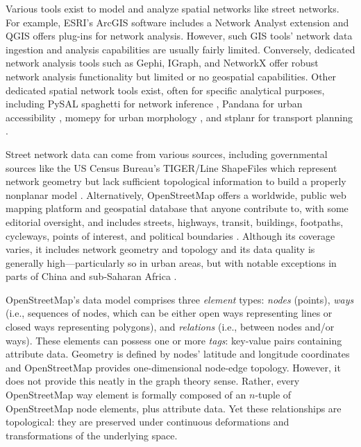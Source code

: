 \documentclass[12pt,letterpaper]{article} %
\begin{document}
Various tools exist to model and analyze spatial networks like street networks. For example, ESRI's ArcGIS software includes a Network Analyst extension and QGIS offers plug-ins for network analysis. However, such GIS tools' network data ingestion and analysis capabilities are usually fairly limited. Conversely, dedicated network analysis tools such as Gephi, IGraph, and NetworkX offer robust network analysis functionality but limited or no geospatial capabilities. Other dedicated spatial network tools exist, often for specific analytical purposes, including PySAL spaghetti for network inference \citep{gaboardi_spaghetti_2021,rey_pysal_2022}, Pandana for urban accessibility \citep{foti_behavioral_2014}, momepy for urban morphology \citep{fleischmann_momepy_2019}, and stplanr for transport planning \citep{lovelace_stplanr_2019}.

Street network data can come from various sources, including governmental sources like the US Census Bureau's TIGER/Line ShapeFiles which represent network geometry but lack sufficient topological information to build a properly nonplanar model \citep{boeing_graph_2025}. Alternatively, OpenStreetMap offers a worldwide, public web mapping platform and geospatial database that anyone contribute to, with some editorial oversight, and includes streets, highways, transit, buildings, footpaths, cycleways, points of interest, and political boundaries \citep{jokar_arsanjani_openstreetmap_2015}. Although its coverage varies, it includes network geometry and topology and its data quality is generally high---particularly so in urban areas, but with notable exceptions in parts of China and sub-Saharan Africa \citep{barron_comprehensive_2014,barrington-leigh_worlds_2017}.

OpenStreetMap's data model comprises three \textit{element} types: \textit{nodes} (points), \textit{ways} (i.e., sequences of nodes, which can be either open ways representing lines or closed ways representing polygons), and \textit{relations} (i.e., between nodes and/or ways). These elements can possess one or more \textit{tags}: key-value pairs containing attribute data. Geometry is defined by nodes' latitude and longitude coordinates and OpenStreetMap provides one-dimensional node-edge topology. However, it does not provide this neatly in the graph theory sense. Rather, every OpenStreetMap way element is formally composed of an $n$-tuple of OpenStreetMap node elements, plus attribute data. Yet these relationships are topological: they are preserved under continuous deformations and transformations of the underlying space.
\end{document}
